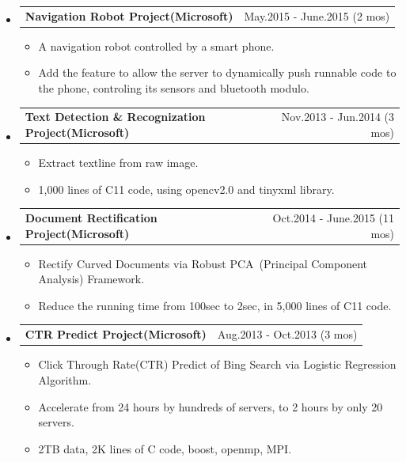\documentclass[a4paper,11pt]{article}
\makeatletter
\newcommand{\ressubheadingsingleline}[2]{
    \begin{tabular*}{6.5in}{l@{\extracolsep{\fill}}r}
        \textbf{#1} & #2 \\
    \end{tabular*}\vspace{-6pt}
}
\newcommand{\CC}{C\nolinebreak\hspace{-.05em}\raisebox{.4ex}{\tiny\bf +}\nolinebreak\hspace{-.10em}\raisebox{.4ex}{\tiny\bf +}}
\newcommand{\CS}{C\nolinebreak\hspace{-.05em}\raisebox{.6ex}{\scriptsize\bf{\#}}}
\makeatother
\begin{document}
\begin{itemize} \setlength{\itemsep}{-3pt}
    \item
        \ressubheadingsingleline{Navigation Robot Project(Microsoft)}{May.2015 - June.2015 (2 mos)}
            \begin{itemize}
                \item A navigation robot controlled by a smart phone.
                \item Add the feature to allow the server to dynamically push runnable code to the phone, controling its sensors and bluetooth modulo.
            \end{itemize}
	\item
		\ressubheadingsingleline{Text Detection \& Recognization Project(Microsoft)}{Nov.2013 - Jun.2014 (3 mos)}
            \begin{itemize}
                \item Extract textline from raw image.
                \item 1,000 lines of \CC{}11 code, using opencv2.0 and tinyxml library. 
            \end{itemize}
	\item 
		\ressubheadingsingleline{Document Rectification Project(Microsoft)}{Oct.2014 - June.2015 (11 mos)}
			\begin{itemize} \setlength{\itemsep}{0pt}
				\item Rectify Curved Documents 
					via Robust PCA\
					(Principal Component Analysis) Framework.
				\item Reduce the running time from 100sec to 2sec, in 5,000 lines of \CC{}11 code.
			\end{itemize} 
	\item 
		\ressubheadingsingleline{CTR Predict Project(Microsoft)}{Aug.2013 - Oct.2013 (3 mos)}
			\begin{itemize} \setlength{\itemsep}{0pt}
				\item Click Through Rate(CTR) Predict of Bing Search
					via Logistic Regression Algorithm.
				\item Accelerate from 24 hours by hundreds of 
					servers, 
					to 2 hours by only 20 servers.  
				\item 2TB data, 2K lines of \CC{} code, boost, openmp, MPI.
			\end{itemize}
\end{itemize}
\end{document}

